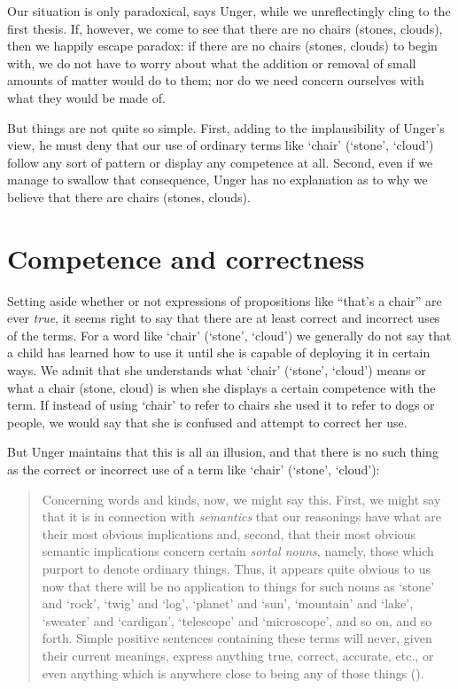 \documentclass[11pt]{article}
\newenvironment{squote}{%
	\begin{quote}\begin{singlespace}%
	}{%
	\end{singlespace}\end{quote}}
\begin{document}
\begin{spacing}{1.5}
Our situation is only paradoxical, says Unger, while we unreflectingly
cling to the first thesis.  If, however, we come to see that there are
no chairs (stones, clouds), then we happily escape paradox: if there
are no chairs (stones, clouds) to begin with, we do not have to worry
about what the addition or removal of small amounts of matter would do
to them; nor do we need concern ourselves with what they would be made
of.

But things are not quite so simple.  First, adding to the
implausibility of Unger's view, he must deny that our use of ordinary
terms like `chair' (`stone', `cloud') follow any sort of pattern or
display any competence at all.  Second, even if we manage to swallow
that consequence, Unger has no explanation as to why we believe that
there are chairs (stones, clouds).

\section{Competence and correctness}
\label{comp}
Setting aside whether or not expressions of propositions like ``that's
a chair'' are ever \emph{true}, it seems right to say that there are
at least correct and incorrect uses of the terms.  For a word like
`chair' (`stone', `cloud') we generally do not say that a child has
learned how to use it until she is capable of deploying it in certain
ways.  We admit that she understands what `chair' (`stone', `cloud')
means or what a chair (stone, cloud) is when she displays a certain
competence with the term.  If instead of using `chair' to refer to
chairs she used it to refer to dogs or people, we would say that she
is confused and attempt to correct her use.

But Unger maintains that this is all an illusion, and that there is no
such thing as the correct or incorrect use of a term like `chair'
(`stone', `cloud'):

\begin{squote}
Concerning words and kinds, now, we might say this.  First, we might
say that it is in connection with \emph{semantics} that our reasonings have
what are their most obvious implications and, second, that their most
obvious semantic implications concern certain \emph{sortal nouns}, namely,
those which purport to denote ordinary things.  Thus, it appears quite
obvious to us now that there will be no application to things for such
nouns as `stone' and `rock', `twig' and `log', `planet' and `sun',
`mountain' and `lake', `sweater' and `cardigan', `telescope' and
`microscope', and so on, and so forth.  Simple positive sentences
containing these terms will never, given their current meanings,
express anything true, correct, accurate, etc., or even anything which
is anywhere close to being any of those things
(\citeyear[148]{unger1979}).
\end{squote}


\end{spacing}
\end{document}
